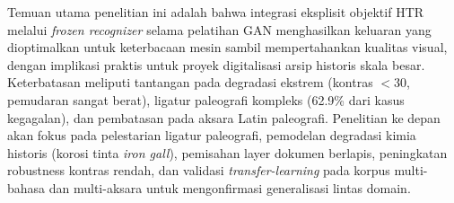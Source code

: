 \documentclass[journal]{IEEEtran}
\begin{document}
Temuan utama penelitian ini adalah bahwa integrasi eksplisit objektif HTR melalui \textit{frozen recognizer} selama pelatihan GAN menghasilkan keluaran yang dioptimalkan untuk keterbacaan mesin sambil mempertahankan kualitas visual, dengan implikasi praktis untuk proyek digitalisasi arsip historis skala besar. Keterbatasan meliputi tantangan pada degradasi ekstrem (kontras $<$30, pemudaran sangat berat), ligatur paleografi kompleks (62.9\% dari kasus kegagalan), dan pembatasan pada aksara Latin paleografi. Penelitian ke depan akan fokus pada pelestarian ligatur paleografi, pemodelan degradasi kimia historis (korosi tinta \textit{iron gall}), pemisahan layer dokumen berlapis, peningkatan robustness kontras rendah, dan validasi \textit{transfer-learning} pada korpus multi-bahasa dan multi-aksara untuk mengonfirmasi generalisasi lintas domain.
\end{document}
